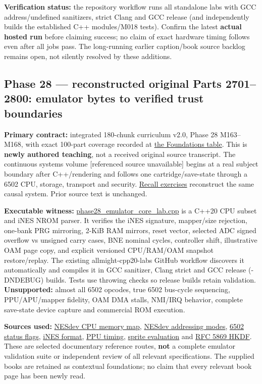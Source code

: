 \textbf{Verification status:} the repository workflow runs all standalone labs with GCC address/undefined sanitizers, strict Clang and GCC release (and independently builds the established C++ modules/M018 tests). Confirm the latest \textbf{actual hosted run} before claiming success; no claim of exact hardware timing follows even after all jobs pass. The long-running earlier caption/book source backlog remains open, not silently resolved by these additions.

\subsection{Phase 28 --- reconstructed original Parts 2701--2800: emulator bytes to verified trust boundaries}\label{appendix-a103e7846d21-phase-28-reconstructed-original-parts-27012800-emulator-bytes-to-verified-trust-boundaries}

\textbf{Primary contract:} integrated 180-chunk curriculum v2.0, Phase 28 M163--M168, with exact 100-part coverage recorded at \hyperref[appendix-fd090d982a15-phase-28-m163m168-parts-27012800-deterministic-and-trusted-low-level-systems]{the Foundations table}. This is \textbf{newly authored teaching}, not a received original source transcript. {The continuous systems volume {[}referenced source unavailable{]}} begins at a real subject boundary after C++/rendering and follows one cartridge/save-state through a 6502 CPU, storage, transport and security. \hyperref[appendix-11f73b337e37]{Recall exercises} reconstruct the same causal system. Prior source text is unchanged.

\textbf{Executable witness:} \hyperref[source-file-552a9e2296dc984412c8f06d]{phase28\_emulator\_core\_lab.cpp} is a C++20 CPU subset and iNES NROM parser. It verifies the iNES signature, mapper/size rejection, one-bank PRG mirroring, 2-KiB RAM mirrors, reset vector, selected ADC signed overflow vs unsigned carry cases, BNE nominal cycles, controller shift, illustrative OAM page copy, and explicit versioned CPU/RAM/OAM snapshot restore/replay. The existing allmight-cpp20-labs GitHub workflow discovers it automatically and compiles it in GCC sanitizer, Clang strict and GCC release (-DNDEBUG) builds. Tests use throwing checks so release builds retain validation. \textbf{Unsupported:} almost all 6502 opcodes, true 6502 bus-cycle sequencing, PPU/APU/mapper fidelity, OAM DMA stalls, NMI/IRQ behavior, complete save-state device capture and commercial ROM execution.

\textbf{Sources used:} \href{https://www.nesdev.org/wiki/CPU_memory_map}{NESdev CPU memory map}, \href{https://www.nesdev.org/wiki/Addressing_modes}{NESdev addressing modes}, \href{https://www.nesdev.org/wiki/Status_flag}{6502 status flags}, \href{https://www.nesdev.org/wiki/INES}{iNES format}, \href{https://www.nesdev.org/wiki/PPU_frame_timing}{PPU timing}, \href{https://www.nesdev.org/wiki/PPU_sprite_evaluation}{sprite evaluation} and \href{https://www.rfc-editor.org/rfc/rfc5869.html}{RFC 5869 HKDF}. These are selected documentary reference routes, \textbf{not} a complete emulator validation suite or independent review of all relevant specifications. The supplied books are retained as contextual foundations; no claim that every relevant book page has been newly read.

